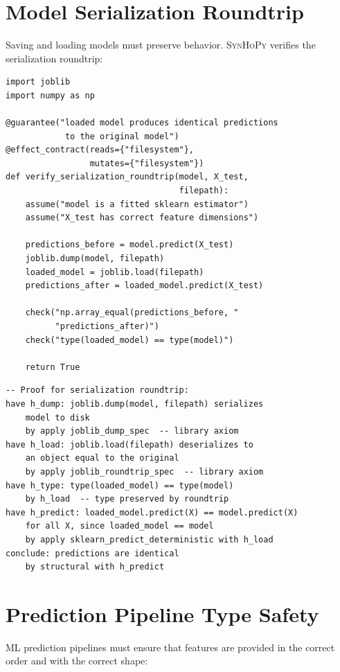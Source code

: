 \documentclass[11pt,a4paper]{report}
\theoremstyle{definition}
\theoremstyle{plain}
\newcommand{\synhopy}{\textsc{SynHoPy}}
\begin{document}
\section{Model Serialization Roundtrip}

Saving and loading models must preserve behavior.  \synhopy{} verifies
the serialization roundtrip:

\begin{lstlisting}[style=synhopy]
import joblib
import numpy as np

@guarantee("loaded model produces identical predictions
            to the original model")
@effect_contract(reads={"filesystem"},
                 mutates={"filesystem"})
def verify_serialization_roundtrip(model, X_test,
                                   filepath):
    assume("model is a fitted sklearn estimator")
    assume("X_test has correct feature dimensions")

    predictions_before = model.predict(X_test)
    joblib.dump(model, filepath)
    loaded_model = joblib.load(filepath)
    predictions_after = loaded_model.predict(X_test)

    check("np.array_equal(predictions_before, "
          "predictions_after)")
    check("type(loaded_model) == type(model)")

    return True
\end{lstlisting}

\begin{lstlisting}[style=proof]
-- Proof for serialization roundtrip:
have h_dump: joblib.dump(model, filepath) serializes
    model to disk
    by apply joblib_dump_spec  -- library axiom
have h_load: joblib.load(filepath) deserializes to
    an object equal to the original
    by apply joblib_roundtrip_spec  -- library axiom
have h_type: type(loaded_model) == type(model)
    by h_load  -- type preserved by roundtrip
have h_predict: loaded_model.predict(X) == model.predict(X)
    for all X, since loaded_model == model
    by apply sklearn_predict_deterministic with h_load
conclude: predictions are identical
    by structural with h_predict
\end{lstlisting}

\section{Prediction Pipeline Type Safety}

ML prediction pipelines must ensure that features are provided in the
correct order and with the correct shape:
\end{document}
